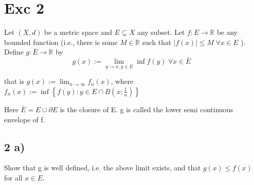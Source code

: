\documentclass[a4paper,norsk]{article}
\renewcommand{\leq}{\leqslant}
\begin{document}
\section*{Exc 2}
Let $ \left( X, d \right)  $ be a metric space and $ E \subseteq X $ any subset. Let $ f : E \to \mathbb{R} $ be any bounded function (i.e., there is some $ M \in \mathbb{R} $ such that $ \left| f(x) \right| \leq M \; \forall x \in E$  ). Define $ g : \bar{E} \to \mathbb{R} $ by
\[
    g(x) := \lim_{y \to x, y \in E} \inf f(y) \; \forall x \in \bar{E}
\]

that is
$ g(x) := \lim_{n \to \infty} f_n(x)  $, where $ f_n(x) := \inf \left\{ f(y) : y \in  E \cap B \left( x; \frac{ 1 }{ n } \right)  \right\}  $

Here $ \bar{E} = E \cup \partial E $ is the closure of E. g is called the lower semi continuous envelope of f.

\subsection*{2 a)}

Show that g is well defined, i.e. the above limit exists, and that $ g(x) \leq f(x) $ for all $ x \in E $.
\end{document}
